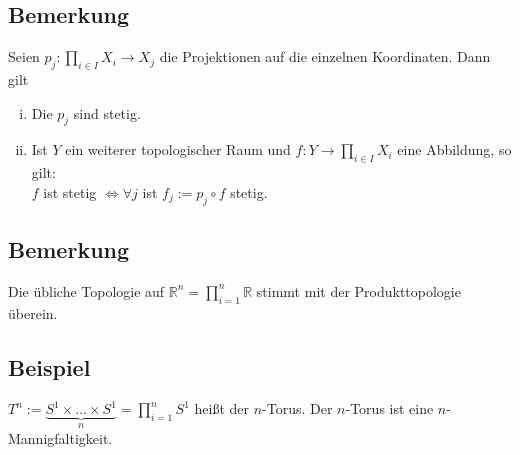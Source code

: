 \subsection[Bemerkung zur Stetigkeit der Projektionen und Stetigkeit im Produktraum]{Bemerkung} %
\label{sub:25}
Seien $p_j : \prod_{i \in I} X_i \to X_j$ die Projektionen auf die einzelnen Koordinaten. Dann gilt
\begin{enumerate}[(i)]
	\item Die $p_j$ sind stetig.
	\item Ist $Y$ ein weiterer topologischer Raum und $f : Y \to \prod_{i \in I} X_i$ eine Abbildung, so gilt: \\
	$f$ ist stetig $\iff \forall j $ ist $f_j := p_j \circ f$ stetig.
\end{enumerate}

\subsection[Bemerkung zur üblichen Topologie auf $\mathds{R}^n$]{Bemerkung} %
\label{sub:26}
Die übliche Topologie auf $\mathds{R}^n = \prod_{i =1}^n \mathds{R}$ stimmt mit der Produkttopologie überein.
\newpage

\subsection[Beispiel: Der Torus, $T^2$]{Beispiel} %
\label{sub:27}
\begin{figure}[h]
\end{figure}
$T^n := \underbrace{S^1 \times \ldots \times S^1}_{n} = \prod_{i=1}^n S^1$ heißt der $n$-Torus. Der $n$-Torus ist eine $n$-Mannigfaltigkeit.



